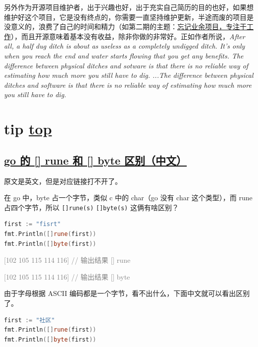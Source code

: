 另外作为开源项目维护者，出于兴趣也好，出于充实自己简历的目的也好，如果想维护好这个项目，它是没有终点的，你需要一直坚持维护更新，半途而废的项目是没意义的，浪费了自己的时间和精力（如第二期的主题：\href{https://github.com/taseikyo/arts/blob/master/weekly/202011w2.md}{忘记业余项目，专注于工作}），而且开源意味着基本没有收益，除非你做的非常好。正如作者所说，\textit{After all, a half dug ditch is about as useless as a completely undigged ditch. It's only when you reach the end and water starts flowing that you get any benefits. The difference between physical ditches and sotware is that there is no reliable way of estimating how much more you still have to dig. ...The difference between physical ditches and software is that there is no reliable way of estimating how much more you still have to dig.}

\section{tip \hyperref[chap:w5]{top}}\label{w5:tip}

\subsection{\href{https://learnku.com/articles/23411/the-difference-between-rune-and-byte-of-go}{go 的 [] rune 和 [] byte 区别（中文）}}

原文是英文，但是对应链接打不开了。

在 go 中，byte 占一个字节，类似 c 中的 char（go 没有 char 这个类型），而 rune 占四个字节，所以 \lstinline{[]rune(s)} \lstinline{[]byte(s)} 这俩有啥区别？

\begin{lstlisting}[language=go]
first := "fisrt"
fmt.Println([]rune(first))
fmt.Println([]byte(first))
\end{lstlisting}

\begin{myquote}
\textcolor{gray}{[102 105 115 114 116] // 输出结果 [] rune}
\end{myquote}

\begin{myquote}
\textcolor{gray}{[102 105 115 114 116] // 输出结果 [] byte}
\end{myquote}

由于字母根据 ASCII 编码都是一个字节，看不出什么，下面中文就可以看出区别了。

\begin{lstlisting}[language=go]
first := "社区"
fmt.Println([]rune(first))
fmt.Println([]byte(first))
\end{lstlisting}

